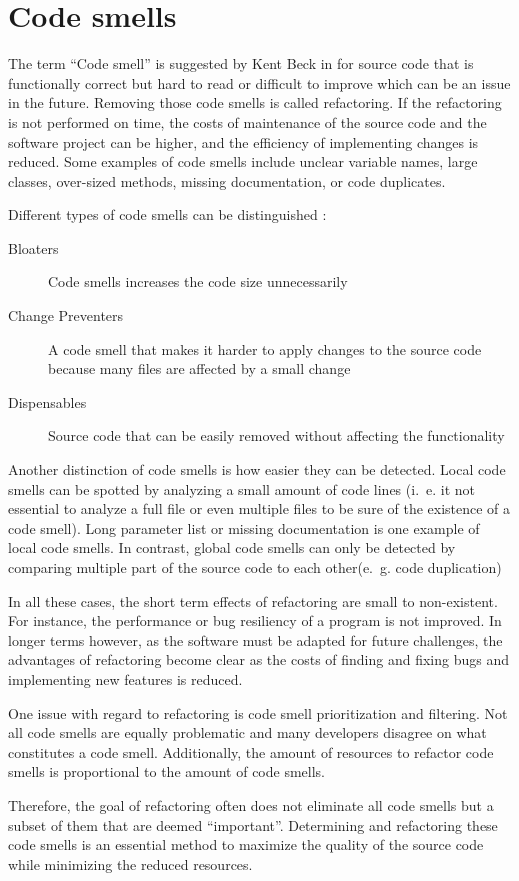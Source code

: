 \section{Code smells}\label{sec:code_smell}

The term \enquote{Code smell} is suggested by Kent Beck in \cite{fowler2019refactoring} for source code that is functionally correct but hard to read or difficult to improve which can be an issue in the future. Removing those code smells is called refactoring. If the refactoring is not performed on time, the costs of maintenance of the source code and the software project can be higher, and the efficiency of implementing changes is reduced. Some examples of code smells include unclear variable names, large classes, over-sized methods, missing documentation, or code duplicates. 

Different types of code smells can be distinguished \cite{data_clumps_refactoring_guru}:
\begin{description}
    \item [Bloaters] Code smells increases the code size unnecessarily 
    \item [Change Preventers] A code smell that makes it harder to apply changes to the source code because many files are affected by a small change
    \item [Dispensables] Source code that can be easily removed without affecting the functionality
\end{description}

Another distinction of code smells is how easier they can be detected. Local code smells can be spotted by analyzing a small amount of code lines (i.~e. it not essential to analyze a full file or even multiple files to be sure of the existence of a code smell). Long parameter list or missing documentation is one example of local code smells.  In contrast, global code smells can only be detected by comparing multiple part of the source code to each other(e.~g. code duplication) 

In all these cases, the short term effects of refactoring are small to non-existent. For instance, the performance or bug resiliency of a program is not improved. In longer terms however, as the software must be adapted for future challenges, the advantages of refactoring become clear as the costs of finding and fixing bugs and implementing new features is reduced. 

One issue with regard to refactoring is code smell prioritization and filtering. Not all code smells are equally problematic and many developers disagree on what constitutes a code smell. Additionally,  the amount of resources to refactor code smells is proportional to the amount of code smells.

Therefore, the goal of refactoring often does not eliminate all code smells but a subset of them that are deemed \enquote{important}. Determining and refactoring these code smells is an essential method to maximize the quality of the source code while minimizing the reduced resources. 